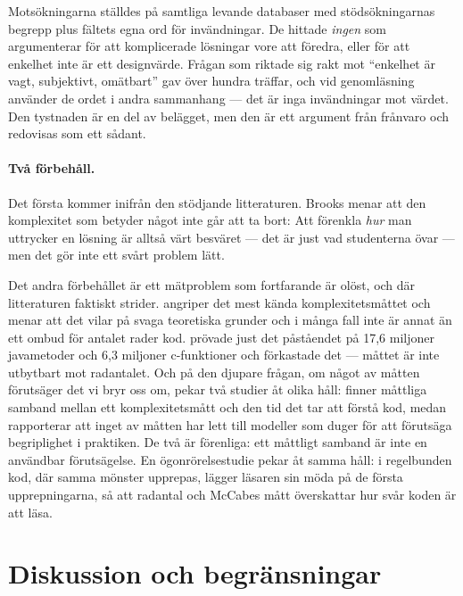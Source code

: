 Motsökningarna ställdes på samtliga levande databaser med stödsökningarnas
begrepp plus fältets egna ord för invändningar.  De hittade \emph{ingen} som
argumenterar för att komplicerade lösningar vore att föredra, eller för att
enkelhet inte är ett designvärde.  Frågan som riktade sig rakt mot
\enquote{enkelhet är vagt, subjektivt, omätbart} gav över hundra träffar,
och vid genomläsning använder de ordet i andra sammanhang --- det är inga
invändningar mot värdet.  Den tystnaden är en del av belägget, men den är ett
argument från frånvaro och redovisas som ett sådant.

\paragraph{Två förbehåll.}  Det första kommer inifrån den stödjande
litteraturen.  Brooks menar att den komplexitet som betyder något inte går
att ta bort:   Att förenkla
\emph{hur} man uttrycker en lösning är alltså värt besväret --- det är just
vad studenterna övar --- men det gör inte ett svårt problem lätt.

Det andra förbehållet är ett mätproblem som fortfarande är olöst, och där
litteraturen
faktiskt strider.  \Textcite[s.~30]{Shepperd1988Critique} angriper det mest
kända komplexitetsmåttet och menar att det vilar på svaga teoretiska grunder
och i många fall inte är annat än ett ombud för antalet rader kod.
\Textcite{Landman2016Empirical} prövade just det påståendet på 17,6 miljoner
javametoder och 6,3 miljoner c-funktioner och förkastade det --- måttet är
inte utbytbart mot radantalet.  Och på den djupare frågan, om något av
måtten förutsäger det vi bryr oss om, pekar två studier åt olika håll:
\textcite{MunozBaron2020Cognitive} finner måttliga samband mellan ett
komplexitetsmått och den tid det tar att förstå kod, medan
\textcite{Lavazza2023Understandability} rapporterar att inget av måtten har
lett till modeller som duger för att förutsäga begriplighet i praktiken.
De två är förenliga: ett måttligt samband är inte en användbar
förutsägelse.  En ögonrörelsestudie pekar åt samma håll: i regelbunden kod,
där samma mönster upprepas, lägger läsaren sin möda på de första
upprepningarna, så att radantal och McCabes mått överskattar hur svår
koden är att läsa\autocite{Jbara2015Regular}.

\section{Diskussion och begränsningar}
\label{sec:kiss-diskussion}

